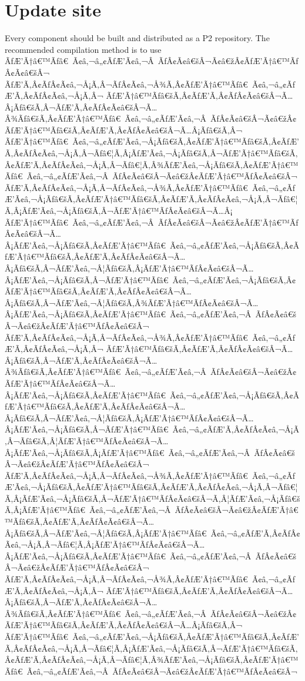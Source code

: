 \documentclass{gemoc} %
\begin{document}
\section{Update site}
Every component should be built and distributed as a P2 repository. The recommended compilation method is to use ÃƒÆ’Ã†â€™Ãƒâ€ Ã¢â‚¬â„¢ÃƒÆ’Ã¢â‚¬Â ÃƒÂ¢Ã¢â€šÂ¬Ã¢â€žÂ¢ÃƒÆ’Ã†â€™ÃƒÂ¢Ã¢â€šÂ¬ ÃƒÆ’Ã‚Â¢ÃƒÂ¢Ã¢â‚¬Å¡Ã‚Â¬ÃƒÂ¢Ã¢â‚¬Å¾Ã‚Â¢ÃƒÆ’Ã†â€™Ãƒâ€ Ã¢â‚¬â„¢ÃƒÆ’Ã‚Â¢ÃƒÂ¢Ã¢â‚¬Å¡Ã‚Â¬ ÃƒÆ’Ã†â€™Ãƒâ€šÃ‚Â¢ÃƒÆ’Ã‚Â¢ÃƒÂ¢Ã¢â€šÂ¬Ã…Â¡Ãƒâ€šÃ‚Â¬ÃƒÆ’Ã‚Â¢ÃƒÂ¢Ã¢â€šÂ¬Ã…Â¾Ãƒâ€šÃ‚Â¢ÃƒÆ’Ã†â€™Ãƒâ€ Ã¢â‚¬â„¢ÃƒÆ’Ã¢â‚¬Â ÃƒÂ¢Ã¢â€šÂ¬Ã¢â€žÂ¢ÃƒÆ’Ã†â€™Ãƒâ€šÃ‚Â¢ÃƒÆ’Ã‚Â¢ÃƒÂ¢Ã¢â€šÂ¬Ã…Â¡Ãƒâ€šÃ‚Â¬ ÃƒÆ’Ã†â€™Ãƒâ€ Ã¢â‚¬â„¢ÃƒÆ’Ã¢â‚¬Å¡Ãƒâ€šÃ‚Â¢ÃƒÆ’Ã†â€™Ãƒâ€šÃ‚Â¢ÃƒÆ’Ã‚Â¢ÃƒÂ¢Ã¢â‚¬Å¡Ã‚Â¬Ãƒâ€¦Ã‚Â¡ÃƒÆ’Ã¢â‚¬Å¡Ãƒâ€šÃ‚Â¬ÃƒÆ’Ã†â€™Ãƒâ€šÃ‚Â¢ÃƒÆ’Ã‚Â¢ÃƒÂ¢Ã¢â‚¬Å¡Ã‚Â¬Ãƒâ€¦Ã‚Â¾ÃƒÆ’Ã¢â‚¬Å¡Ãƒâ€šÃ‚Â¢ÃƒÆ’Ã†â€™Ãƒâ€ Ã¢â‚¬â„¢ÃƒÆ’Ã¢â‚¬Â ÃƒÂ¢Ã¢â€šÂ¬Ã¢â€žÂ¢ÃƒÆ’Ã†â€™ÃƒÂ¢Ã¢â€šÂ¬ ÃƒÆ’Ã‚Â¢ÃƒÂ¢Ã¢â‚¬Å¡Ã‚Â¬ÃƒÂ¢Ã¢â‚¬Å¾Ã‚Â¢ÃƒÆ’Ã†â€™Ãƒâ€ Ã¢â‚¬â„¢ÃƒÆ’Ã¢â‚¬Å¡Ãƒâ€šÃ‚Â¢ÃƒÆ’Ã†â€™Ãƒâ€šÃ‚Â¢ÃƒÆ’Ã‚Â¢ÃƒÂ¢Ã¢â‚¬Å¡Ã‚Â¬Ãƒâ€¦Ã‚Â¡ÃƒÆ’Ã¢â‚¬Å¡Ãƒâ€šÃ‚Â¬ÃƒÆ’Ã†â€™ÃƒÂ¢Ã¢â€šÂ¬Ã…Â¡ ÃƒÆ’Ã†â€™Ãƒâ€ Ã¢â‚¬â„¢ÃƒÆ’Ã¢â‚¬Â ÃƒÂ¢Ã¢â€šÂ¬Ã¢â€žÂ¢ÃƒÆ’Ã†â€™ÃƒÂ¢Ã¢â€šÂ¬Ã…Â¡ÃƒÆ’Ã¢â‚¬Å¡Ãƒâ€šÃ‚Â¢ÃƒÆ’Ã†â€™Ãƒâ€ Ã¢â‚¬â„¢ÃƒÆ’Ã¢â‚¬Å¡Ãƒâ€šÃ‚Â¢ÃƒÆ’Ã†â€™Ãƒâ€šÃ‚Â¢ÃƒÆ’Ã‚Â¢ÃƒÂ¢Ã¢â€šÂ¬Ã…Â¡Ãƒâ€šÃ‚Â¬ÃƒÆ’Ã¢â‚¬Â¦Ãƒâ€šÃ‚Â¡ÃƒÆ’Ã†â€™ÃƒÂ¢Ã¢â€šÂ¬Ã…Â¡ÃƒÆ’Ã¢â‚¬Å¡Ãƒâ€šÃ‚Â¬ÃƒÆ’Ã†â€™Ãƒâ€ Ã¢â‚¬â„¢ÃƒÆ’Ã¢â‚¬Å¡Ãƒâ€šÃ‚Â¢ÃƒÆ’Ã†â€™Ãƒâ€šÃ‚Â¢ÃƒÆ’Ã‚Â¢ÃƒÂ¢Ã¢â€šÂ¬Ã…Â¡Ãƒâ€šÃ‚Â¬ÃƒÆ’Ã¢â‚¬Â¦Ãƒâ€šÃ‚Â¾ÃƒÆ’Ã†â€™ÃƒÂ¢Ã¢â€šÂ¬Ã…Â¡ÃƒÆ’Ã¢â‚¬Å¡Ãƒâ€šÃ‚Â¢ÃƒÆ’Ã†â€™Ãƒâ€ Ã¢â‚¬â„¢ÃƒÆ’Ã¢â‚¬Â ÃƒÂ¢Ã¢â€šÂ¬Ã¢â€žÂ¢ÃƒÆ’Ã†â€™ÃƒÂ¢Ã¢â€šÂ¬ ÃƒÆ’Ã‚Â¢ÃƒÂ¢Ã¢â‚¬Å¡Ã‚Â¬ÃƒÂ¢Ã¢â‚¬Å¾Ã‚Â¢ÃƒÆ’Ã†â€™Ãƒâ€ Ã¢â‚¬â„¢ÃƒÆ’Ã‚Â¢ÃƒÂ¢Ã¢â‚¬Å¡Ã‚Â¬ ÃƒÆ’Ã†â€™Ãƒâ€šÃ‚Â¢ÃƒÆ’Ã‚Â¢ÃƒÂ¢Ã¢â€šÂ¬Ã…Â¡Ãƒâ€šÃ‚Â¬ÃƒÆ’Ã‚Â¢ÃƒÂ¢Ã¢â€šÂ¬Ã…Â¾Ãƒâ€šÃ‚Â¢ÃƒÆ’Ã†â€™Ãƒâ€ Ã¢â‚¬â„¢ÃƒÆ’Ã¢â‚¬Â ÃƒÂ¢Ã¢â€šÂ¬Ã¢â€žÂ¢ÃƒÆ’Ã†â€™ÃƒÂ¢Ã¢â€šÂ¬Ã…Â¡ÃƒÆ’Ã¢â‚¬Å¡Ãƒâ€šÃ‚Â¢ÃƒÆ’Ã†â€™Ãƒâ€ Ã¢â‚¬â„¢ÃƒÆ’Ã¢â‚¬Å¡Ãƒâ€šÃ‚Â¢ÃƒÆ’Ã†â€™Ãƒâ€šÃ‚Â¢ÃƒÆ’Ã‚Â¢ÃƒÂ¢Ã¢â€šÂ¬Ã…Â¡Ãƒâ€šÃ‚Â¬ÃƒÆ’Ã¢â‚¬Â¦Ãƒâ€šÃ‚Â¡ÃƒÆ’Ã†â€™ÃƒÂ¢Ã¢â€šÂ¬Ã…Â¡ÃƒÆ’Ã¢â‚¬Å¡Ãƒâ€šÃ‚Â¬ÃƒÆ’Ã†â€™Ãƒâ€ Ã¢â‚¬â„¢ÃƒÆ’Ã‚Â¢ÃƒÂ¢Ã¢â‚¬Å¡Ã‚Â¬Ãƒâ€šÃ‚Â¦ÃƒÆ’Ã†â€™ÃƒÂ¢Ã¢â€šÂ¬Ã…Â¡ÃƒÆ’Ã¢â‚¬Å¡Ãƒâ€šÃ‚Â¡ÃƒÆ’Ã†â€™Ãƒâ€ Ã¢â‚¬â„¢ÃƒÆ’Ã¢â‚¬Â ÃƒÂ¢Ã¢â€šÂ¬Ã¢â€žÂ¢ÃƒÆ’Ã†â€™ÃƒÂ¢Ã¢â€šÂ¬ ÃƒÆ’Ã‚Â¢ÃƒÂ¢Ã¢â‚¬Å¡Ã‚Â¬ÃƒÂ¢Ã¢â‚¬Å¾Ã‚Â¢ÃƒÆ’Ã†â€™Ãƒâ€ Ã¢â‚¬â„¢ÃƒÆ’Ã¢â‚¬Å¡Ãƒâ€šÃ‚Â¢ÃƒÆ’Ã†â€™Ãƒâ€šÃ‚Â¢ÃƒÆ’Ã‚Â¢ÃƒÂ¢Ã¢â‚¬Å¡Ã‚Â¬Ãƒâ€¦Ã‚Â¡ÃƒÆ’Ã¢â‚¬Å¡Ãƒâ€šÃ‚Â¬ÃƒÆ’Ã†â€™ÃƒÂ¢Ã¢â€šÂ¬Ã‚Â¦ÃƒÆ’Ã¢â‚¬Å¡Ãƒâ€šÃ‚Â¡ÃƒÆ’Ã†â€™Ãƒâ€ Ã¢â‚¬â„¢ÃƒÆ’Ã¢â‚¬Â ÃƒÂ¢Ã¢â€šÂ¬Ã¢â€žÂ¢ÃƒÆ’Ã†â€™Ãƒâ€šÃ‚Â¢ÃƒÆ’Ã‚Â¢ÃƒÂ¢Ã¢â€šÂ¬Ã…Â¡Ãƒâ€šÃ‚Â¬ÃƒÆ’Ã¢â‚¬Â¦Ãƒâ€šÃ‚Â¡ÃƒÆ’Ã†â€™Ãƒâ€ Ã¢â‚¬â„¢ÃƒÆ’Ã‚Â¢ÃƒÂ¢Ã¢â‚¬Å¡Ã‚Â¬Ãƒâ€¦Ã‚Â¡ÃƒÆ’Ã†â€™ÃƒÂ¢Ã¢â€šÂ¬Ã…Â¡ÃƒÆ’Ã¢â‚¬Å¡Ãƒâ€šÃ‚Â¢ÃƒÆ’Ã†â€™Ãƒâ€ Ã¢â‚¬â„¢ÃƒÆ’Ã¢â‚¬Â ÃƒÂ¢Ã¢â€šÂ¬Ã¢â€žÂ¢ÃƒÆ’Ã†â€™ÃƒÂ¢Ã¢â€šÂ¬ ÃƒÆ’Ã‚Â¢ÃƒÂ¢Ã¢â‚¬Å¡Ã‚Â¬ÃƒÂ¢Ã¢â‚¬Å¾Ã‚Â¢ÃƒÆ’Ã†â€™Ãƒâ€ Ã¢â‚¬â„¢ÃƒÆ’Ã‚Â¢ÃƒÂ¢Ã¢â‚¬Å¡Ã‚Â¬ ÃƒÆ’Ã†â€™Ãƒâ€šÃ‚Â¢ÃƒÆ’Ã‚Â¢ÃƒÂ¢Ã¢â€šÂ¬Ã…Â¡Ãƒâ€šÃ‚Â¬ÃƒÆ’Ã‚Â¢ÃƒÂ¢Ã¢â€šÂ¬Ã…Â¾Ãƒâ€šÃ‚Â¢ÃƒÆ’Ã†â€™Ãƒâ€ Ã¢â‚¬â„¢ÃƒÆ’Ã¢â‚¬Â ÃƒÂ¢Ã¢â€šÂ¬Ã¢â€žÂ¢ÃƒÆ’Ã†â€™Ãƒâ€šÃ‚Â¢ÃƒÆ’Ã‚Â¢ÃƒÂ¢Ã¢â€šÂ¬Ã…Â¡Ãƒâ€šÃ‚Â¬ ÃƒÆ’Ã†â€™Ãƒâ€ Ã¢â‚¬â„¢ÃƒÆ’Ã¢â‚¬Å¡Ãƒâ€šÃ‚Â¢ÃƒÆ’Ã†â€™Ãƒâ€šÃ‚Â¢ÃƒÆ’Ã‚Â¢ÃƒÂ¢Ã¢â‚¬Å¡Ã‚Â¬Ãƒâ€¦Ã‚Â¡ÃƒÆ’Ã¢â‚¬Å¡Ãƒâ€šÃ‚Â¬ÃƒÆ’Ã†â€™Ãƒâ€šÃ‚Â¢ÃƒÆ’Ã‚Â¢ÃƒÂ¢Ã¢â‚¬Å¡Ã‚Â¬Ãƒâ€¦Ã‚Â¾ÃƒÆ’Ã¢â‚¬Å¡Ãƒâ€šÃ‚Â¢ÃƒÆ’Ã†â€™Ãƒâ€ Ã¢â‚¬â„¢ÃƒÆ’Ã¢â‚¬Â ÃƒÂ¢Ã¢â€šÂ¬Ã¢â€žÂ¢ÃƒÆ’Ã†â€™ÃƒÂ¢Ã¢â€šÂ¬ 
\end{document}
